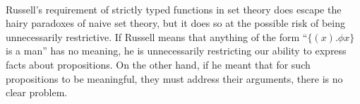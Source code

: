\documentclass{article}
\begin{document}
\paragraph{}
Russell’s requirement of strictly typed functions in set theory does escape the hairy paradoxes of naive set theory, but it does so at the possible risk of being unnecessarily restrictive. If Russell means that anything of the form “$\{(x).\phi x\}$ is a man” has no meaning, he is unnecessarily restricting our ability to express facts about propositions. On the other hand, if he meant that for such propositions to be meaningful, they must address their arguments, there is no clear problem.
\end{document}
